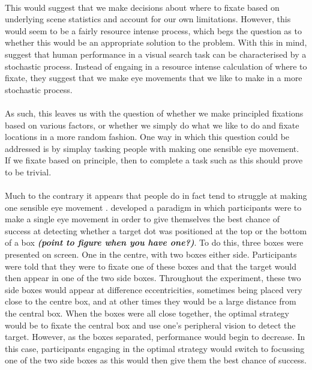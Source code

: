 \documentclass[12pt]{article}
\begin{document}
\paragraph{} This would suggest that we make decisions about where to fixate based on underlying scene statistics and account for our own limitations. However, this would seem to be a fairly resource intense process, which begs the question as to whether this would be an appropriate solution to the problem. With this in mind, \cite{clarke2016stocha} suggest that human performance in a visual search task can be characterised by a stochastic process. Instead of engaing in a resource intense calculation of where to fixate, they suggest that we make eye movements that we like to make in a more stochastic process. 

\paragraph{} As such, this leaves us with the question of whether we make principled fixations based on various factors, or whether we simply do what we like to do and fixate locations in a more random fashion. One way in which this question could be addressed is by simplay tasking people with making one sensible eye movement. If we fixate based on principle, then to complete a task such as this should prove to be trivial. 

\paragraph{} Much to the contrary it appears that people do in fact tend to struggle at making one sensible eye movement \citep{morvan2012human,clarke2015failure}. \cite{morvan2012human} developed a paradigm in which participants were to make a single eye movement in order to give themselves the best chance of success at detecting whether a target dot was positioned at the top or the bottom of a box \textbf{\textit{(point to figure when you have one?)}}. To do this, three boxes were presented on screen. One in the centre, with two boxes either side. Participants were told that they were to fixate one of these boxes and that the target would then appear in one of the two side boxes. Throughout the experiment, these two side boxes would appear at difference eccentricities, sometimes being placed very close to the centre box, and at other times they would be a large distance from the central box. When the boxes were all close together, the optimal strategy would be to fixate the central box and use one's peripheral vision to detect the target. However, as the boxes separated, performance would begin to decrease. In this case, participants engaging in the optimal strategy would switch to focussing one of the two side boxes as this would then give them the best chance of success. 
\end{document}

